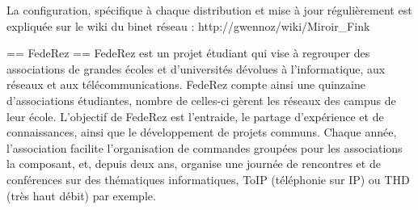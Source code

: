 La configuration, spécifique à chaque distribution et mise à jour régulièrement est expliquée sur le wiki du binet réseau : 
http://gwennoz/wiki/Miroir_Fink

== FedeRez ==
FedeRez est un projet étudiant qui vise à regrouper des associations de
grandes écoles et d'universités dévolues à l'informatique, aux réseaux
et aux télécommunications. FedeRez compte ainsi une quinzaine
d'associations étudiantes, nombre de celles-ci gèrent les réseaux des
campus de leur école. L'objectif de FedeRez est l'entraide, le partage
d'expérience et de connaissances, ainsi que le développement de projets
communs.
Chaque année, l'association facilite l'organisation de commandes groupées pour les associations la composant, et, depuis deux ans, organise une journée de rencontres et de conférences sur des thématiques informatiques, ToIP (téléphonie sur IP) ou THD (très haut débit) par exemple.